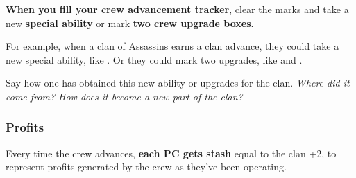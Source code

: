 \textbf{When you fill your crew advancement tracker}, clear the marks and take a new \textbf{special ability} or mark \textbf{two crew upgrade boxes}.

\begin{qb}For example, when a clan of Assassins earns a clan advance, they could take a new special ability, like . Or they could mark two upgrades, like  and .\end{qb}

Say how one has obtained this new ability or upgrades for the clan. \textit{Where did it come from? How does it become a new part of the clan?}

\subsubsection{Profits}

Every time the crew advances, \textbf{each PC gets stash} equal to the clan +2, to represent profits generated by the crew as they’ve been operating.


